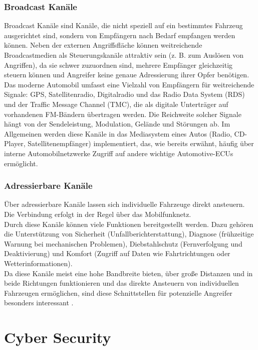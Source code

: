 \subsubsection{Broadcast Kanäle}
Broadcast Kanäle sind Kanäle, die nicht speziell auf ein bestimmtes Fahrzeug ausgerichtet sind, sondern von Empfängern nach Bedarf empfangen werden können. Neben der externen Angriffsfläche können weitreichende Broadcastmedien als Steuerungskanäle attraktiv sein (z. B. zum Auslösen von Angriffen), da sie schwer zuzuordnen sind, mehrere Empfänger gleichzeitig steuern können und Angreifer keine genaue Adressierung ihrer Opfer benötigen.
Das moderne Automobil umfasst eine Vielzahl von Empfängern für weitreichende Signale: \ac{GPS}, Satellitenradio, Digitalradio und das Radio Data System (RDS) und der Traffic Message Channel (TMC), die als digitale Unterträger auf vorhandenen FM-Bändern übertragen werden. Die Reichweite solcher Signale hängt von der Sendeleistung, Modulation, Gelände und Störungen ab. Im Allgemeinen werden diese Kanäle in das Mediasystem eines Autos (Radio, CD-Player, Satellitenempfänger) implementiert, das, wie bereits erwähnt, häufig über interne Automobilnetzwerke Zugriff auf andere wichtige Automotive-ECUs ermöglicht. \cite[4\psq]{Checkoway.2011}

\subsubsection{Adressierbare Kanäle}
Über adressierbare Kanäle lassen sich individuelle Fahrzeuge direkt ansteuern. Die Verbindung erfolgt in der Regel über das Mobilfunknetz.\\
Durch diese Kanäle können viele Funktionen bereitgestellt werden. Dazu gehören die Unterstützung von Sicherheit (Unfallberichterstattung), Diagnose (frühzeitige Warnung bei mechanischen Problemen), Diebstahlschutz (Fernverfolgung und Deaktivierung) und Komfort (Zugriff auf Daten wie Fahrtrichtungen oder Wetterinformationen). \cite[5]{Checkoway.2011} \\
Da diese Kanäle meist eine hohe Bandbreite bieten, über große Distanzen und in beide Richtungen funktionieren und das direkte Ansteuern von individuellen Fahrzeugen ermöglichen, sind diese Schnittstellen für potenzielle Angreifer besonders interessant \cite[5]{Checkoway.2011}.




\section{Cyber Security}
